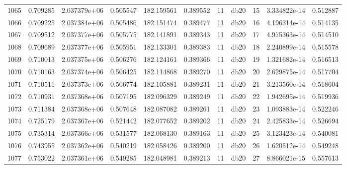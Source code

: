 \begin{tabular}{lrrrrrrlrrr}
1065 &    0.709285 &        2.037379e+06 &  0.505547 &              182.159561 &    0.389552 &      11 &         db20 &     15 &   3.334822e-14 &      0.512887 \\
1066 &    0.709225 &        2.037384e+06 &  0.505486 &              182.151474 &    0.389477 &      11 &         db20 &     16 &   4.196314e-14 &      0.514135 \\
1067 &    0.709512 &        2.037377e+06 &  0.505775 &              182.141891 &    0.389343 &      11 &         db20 &     17 &   4.975363e-14 &      0.514510 \\
1068 &    0.709689 &        2.037377e+06 &  0.505951 &              182.133301 &    0.389383 &      11 &         db20 &     18 &   2.240899e-14 &      0.515578 \\
1069 &    0.710013 &        2.037375e+06 &  0.506276 &              182.124161 &    0.389366 &      11 &         db20 &     19 &   1.321682e-14 &      0.516513 \\
1070 &    0.710163 &        2.037374e+06 &  0.506425 &              182.114868 &    0.389270 &      11 &         db20 &     20 &   2.629875e-14 &      0.517704 \\
1071 &    0.710511 &        2.037373e+06 &  0.506774 &              182.105881 &    0.389231 &      11 &         db20 &     21 &   3.213560e-14 &      0.518604 \\
1072 &    0.710931 &        2.037368e+06 &  0.507195 &              182.096329 &    0.389249 &      11 &         db20 &     22 &   1.942695e-14 &      0.519936 \\
1073 &    0.711384 &        2.037368e+06 &  0.507648 &              182.087082 &    0.389261 &      11 &         db20 &     23 &   1.093883e-14 &      0.522246 \\
1074 &    0.725179 &        2.037367e+06 &  0.521442 &              182.077652 &    0.389202 &      11 &         db20 &     24 &   2.425833e-14 &      0.526694 \\
1075 &    0.735314 &        2.037366e+06 &  0.531577 &              182.068130 &    0.389163 &      11 &         db20 &     25 &   3.123423e-14 &      0.540081 \\
1076 &    0.743955 &        2.037362e+06 &  0.540219 &              182.058426 &    0.389200 &      11 &         db20 &     26 &   1.620512e-14 &      0.549248 \\
1077 &    0.753022 &        2.037361e+06 &  0.549285 &              182.048981 &    0.389213 &      11 &         db20 &     27 &   8.866021e-15 &      0.557613 \\

\end{tabular}
